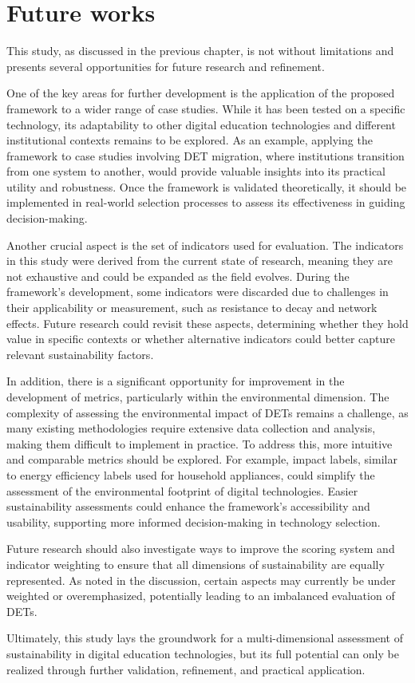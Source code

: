 \section{Future works}
This study, as discussed in the previous chapter, is not without limitations and presents several opportunities for future research and refinement. 

One of the key areas for further development is the application of the proposed framework to a wider range of case studies. While it has been tested on a specific technology, its adaptability to other digital education technologies and different institutional contexts remains to be explored. As an example, applying the framework to case studies involving DET migration, where institutions transition from one system to another, would provide valuable insights into its practical utility and robustness. Once the framework is validated theoretically, it should be implemented in real-world selection processes to assess its effectiveness in guiding decision-making.

Another crucial aspect is the set of indicators used for evaluation. The indicators in this study were derived from the current state of research, meaning they are not exhaustive and could be expanded as the field evolves. During the framework's development, some indicators were discarded due to challenges in their applicability or measurement, such as resistance to decay and network effects. Future research could revisit these aspects, determining whether they hold value in specific contexts or whether alternative indicators could better capture relevant sustainability factors.

In addition, there is a significant opportunity for improvement in the development of metrics, particularly within the environmental dimension. The complexity of assessing the environmental impact of DETs remains a challenge, as many existing methodologies require extensive data collection and analysis, making them difficult to implement in practice. To address this, more intuitive and comparable metrics should be explored. For example, impact labels, similar to energy efficiency labels used for household appliances, could simplify the assessment of the environmental footprint of digital technologies. Easier sustainability assessments could enhance the framework’s accessibility and usability, supporting more informed decision-making in technology selection.

Future research should also investigate ways to improve the scoring system and indicator weighting to ensure that all dimensions of sustainability are equally represented. As noted in the discussion, certain aspects may currently be under weighted or overemphasized, potentially leading to an imbalanced evaluation of DETs.

Ultimately, this study lays the groundwork for a multi-dimensional assessment of sustainability in digital education technologies, but its full potential can only be realized through further validation, refinement, and practical application.

